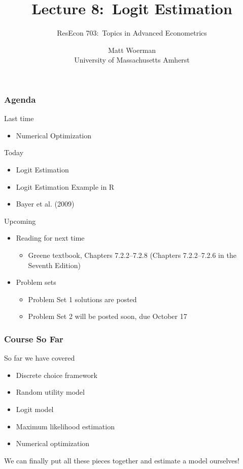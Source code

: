 \documentclass{beamer}
\title[Lecture 8:\ Logit Estimation]{Lecture 8:\ Logit Estimation}
\author[ResEcon 703:\ Advanced Econometrics]{ResEcon 703:\ Topics in Advanced Econometrics}
\date{Matt Woerman\\University of Massachusetts Amherst}
\begin{document}
{ 
\begin{frame}[noframenumbering]
    \titlepage
\end{frame}
}

\begin{frame}\frametitle{Agenda}
    Last time
    \begin{itemize}
        \item Numerical Optimization
    \end{itemize}
    \vspace{2ex}
    Today
    \begin{itemize}
    	\item Logit Estimation
    	\item Logit Estimation Example in R
        \item Bayer et al. (2009)
    \end{itemize}
    \vspace{2ex}
    Upcoming
    \begin{itemize}
        \item Reading for next time
        \begin{itemize}
            \item Greene textbook, Chapters 7.2.2--7.2.8 (Chapters 7.2.2--7.2.6 in the Seventh Edition)
        \end{itemize}
        \item Problem sets
        \begin{itemize}
            \item Problem Set 1 solutions are posted
            \item Problem Set 2 will be posted soon, due October 17
        \end{itemize}
    \end{itemize}
\end{frame}

\begin{frame}\frametitle{Course So Far}
    So far we have covered
    \begin{itemize}
    	\item Discrete choice framework
    	\item Random utility model
    	\item Logit model
    	\item Maximum likelihood estimation
    	\item Numerical optimization
    \end{itemize}
    \vspace{3ex}
    We can finally put all these pieces together and estimate a model ourselves!
\end{frame}
\end{document}
